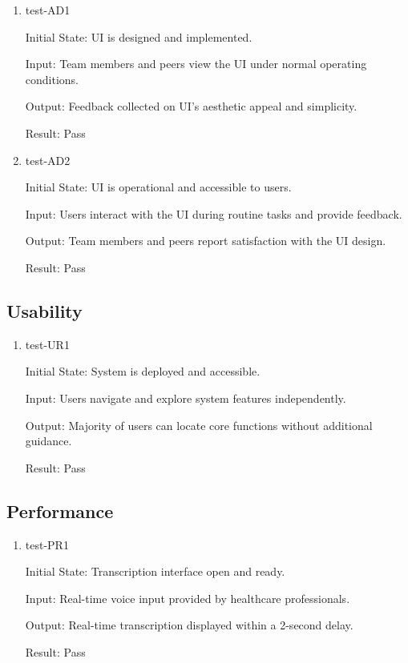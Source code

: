 \documentclass[12pt, titlepage]{article}
\begin{document}
\begin{enumerate}

  \item {test-AD1} \label{test-AD1}

  Initial State: UI is designed and implemented.

  Input: Team members and peers view the UI under normal operating conditions.

  Output: Feedback collected on UI’s aesthetic appeal and simplicity.

  Result: Pass

  \item {test-AD2} \label{test-AD2}

  Initial State: UI is operational and accessible to users.

  Input: Users interact with the UI during routine tasks and provide feedback.

  Output: Team members and peers report satisfaction with the UI design.

  Result: Pass

\end{enumerate}

\subsection{Usability} \label{section:4.2}

\begin{enumerate}

  \item {test-UR1} \label{test-UR1}

  Initial State: System is deployed and accessible.

  Input: Users navigate and explore system features independently.

  Output: Majority of users can locate core functions without additional guidance.

  Result: Pass

\end{enumerate}

\subsection{Performance} \label{section:4.3}

\begin{enumerate}
\item test-PR1 \label{test-PR1}

Initial State: Transcription interface open and ready.

Input: Real-time voice input provided by healthcare professionals.

Output: Real-time transcription displayed within a 2-second delay.

Result: Pass 

\end{enumerate}
\end{document}
